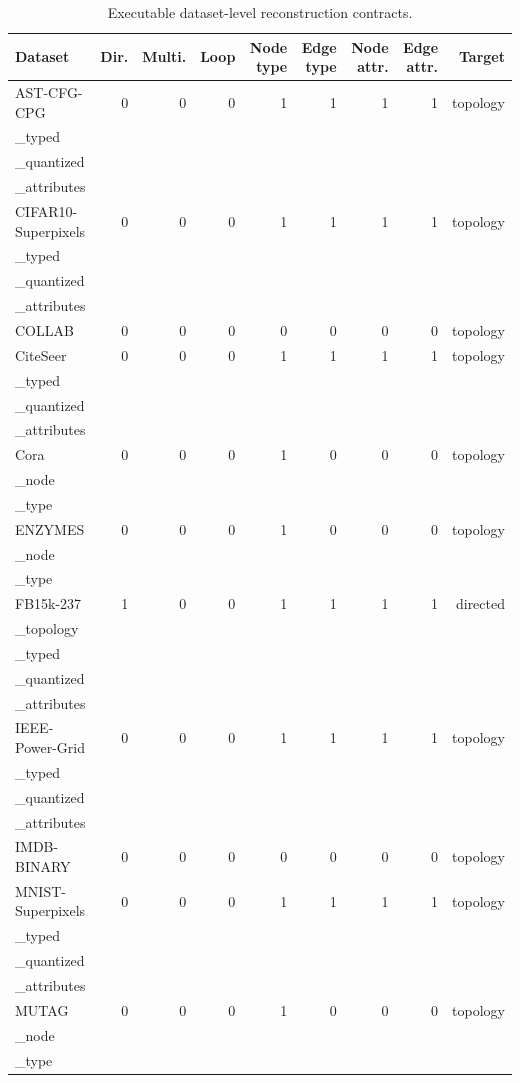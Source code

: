 \begin{table}[t]
\centering
\caption{Executable dataset-level reconstruction contracts.}
\begin{tabular}{lrrrrrrrr}
\toprule
Dataset & Dir. & Multi. & Loop & Node type & Edge type & Node attr. & Edge attr. & Target \\
\midrule
AST-CFG-CPG & 0 & 0 & 0 & 1 & 1 & 1 & 1 & topology\\_typed\\_quantized\\_attributes \\
CIFAR10-Superpixels & 0 & 0 & 0 & 1 & 1 & 1 & 1 & topology\\_typed\\_quantized\\_attributes \\
COLLAB & 0 & 0 & 0 & 0 & 0 & 0 & 0 & topology \\
CiteSeer & 0 & 0 & 0 & 1 & 1 & 1 & 1 & topology\\_typed\\_quantized\\_attributes \\
Cora & 0 & 0 & 0 & 1 & 0 & 0 & 0 & topology\\_node\\_type \\
ENZYMES & 0 & 0 & 0 & 1 & 0 & 0 & 0 & topology\\_node\\_type \\
FB15k-237 & 1 & 0 & 0 & 1 & 1 & 1 & 1 & directed\\_topology\\_typed\\_quantized\\_attributes \\
IEEE-Power-Grid & 0 & 0 & 0 & 1 & 1 & 1 & 1 & topology\\_typed\\_quantized\\_attributes \\
IMDB-BINARY & 0 & 0 & 0 & 0 & 0 & 0 & 0 & topology \\
MNIST-Superpixels & 0 & 0 & 0 & 1 & 1 & 1 & 1 & topology\\_typed\\_quantized\\_attributes \\
MUTAG & 0 & 0 & 0 & 1 & 0 & 0 & 0 & topology\\_node\\_type \\

\end{tabular}
\end{table}
